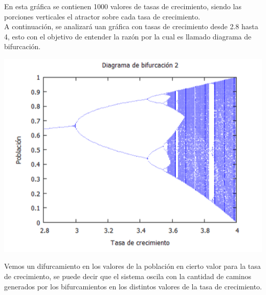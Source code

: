 \documentclass{article}
\begin{document}
En esta gráfica se contienen 1000 valores de tasas de crecimiento, siendo las porciones verticales el atractor sobre cada tasa de crecimiento. 
\\
A continuación, se analizará uan gráfica con tasas de crecimiento desde 2.8 hasta 4, esto con el objetivo de entender la razón por la cual es llamado diagrama de bifurcación.

\begin{center}
\includegraphics[scale=0.6]{Act103.PNG}
\end{center}
Vemos un difurcamiento en los valores de la población en cierto valor para la tasa de crecimiento, se puede decir que el sistema oscila con la cantidad de caminos generados por los bifurcamientos en los distintos valores de la tasa de crecimiento.
\end{document}

